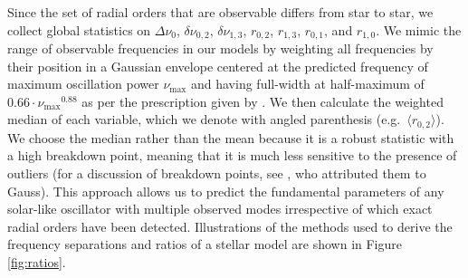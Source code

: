 \documentclass[twocolumn,twocolappendix]{aastex6}
\begin{document}
Since the set of radial orders that are observable differs from star to star, we collect global statistics on $\Delta\nu_0$, $\delta\nu_{0,2}$, $\delta\nu_{1,3}$, $r_{0,2}$, $r_{1,3}$, $r_{0,1}$, and $r_{1,0}$. We mimic the range of observable frequencies in our models by weighting all frequencies by their position in a Gaussian envelope centered at the predicted frequency of maximum oscillation power $\nu_{\max}$ and having full-width at half-maximum of $0.66\cdot\nu_{\max}{}^{0.88}$ as per the prescription given by \citet{2012A&A...537A..30M}. We then calculate the weighted median of each variable, which we denote with angled parenthesis (e.g.\ $\langle r_{0,2}\rangle$). We choose the median rather than the mean because it is a robust statistic with a high breakdown point, meaning that it is much less sensitive to the presence of outliers (for a discussion of breakdown points, see \citealt{hampel1971general}, who attributed them to Gauss). This approach allows us to predict the fundamental parameters of any solar-like oscillator with multiple observed modes irrespective of which exact radial orders have been detected. Illustrations of the methods used to derive the frequency separations and ratios of a stellar model are shown in Figure \ref{fig:ratios}. 
\end{document}
